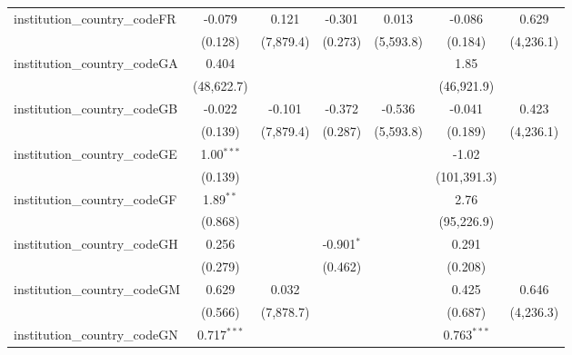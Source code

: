 \begin{tabular}{lcccccc}
   institution\_country\_codeFR          & -0.079         & 0.121         & -0.301         & 0.013         & -0.086         & 0.629\\   
                                         & (0.128)        & (7,879.4)     & (0.273)        & (5,593.8)     & (0.184)        & (4,236.1)\\   
   institution\_country\_codeGA          & 0.404          &               &                &               & 1.85           &   \\   
                                         & (48,622.7)     &               &                &               & (46,921.9)     &   \\   
   institution\_country\_codeGB          & -0.022         & -0.101        & -0.372         & -0.536        & -0.041         & 0.423\\   
                                         & (0.139)        & (7,879.4)     & (0.287)        & (5,593.8)     & (0.189)        & (4,236.1)\\   
   institution\_country\_codeGE          & 1.00$^{***}$   &               &                &               & -1.02          &   \\   
                                         & (0.139)        &               &                &               & (101,391.3)    &   \\   
   institution\_country\_codeGF          & 1.89$^{**}$    &               &                &               & 2.76           &   \\   
                                         & (0.868)        &               &                &               & (95,226.9)     &   \\   
   institution\_country\_codeGH          & 0.256          &               & -0.901$^{*}$   &               & 0.291          &   \\   
                                         & (0.279)        &               & (0.462)        &               & (0.208)        &   \\   
   institution\_country\_codeGM          & 0.629          & 0.032         &                &               & 0.425          & 0.646\\   
                                         & (0.566)        & (7,878.7)     &                &               & (0.687)        & (4,236.3)\\   
   institution\_country\_codeGN          & 0.717$^{***}$  &               &                &               & 0.763$^{***}$  &   \\   

\end{tabular}
